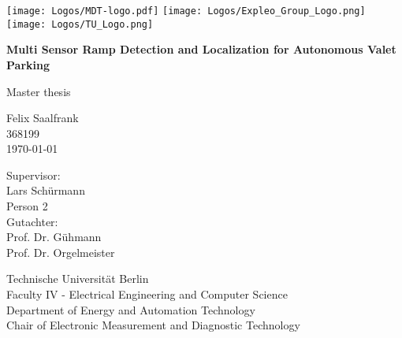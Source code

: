 \begin{titlepage}
	\begin{center} %
		\texttt{[image: Logos/MDT-logo.pdf]}
		\texttt{[image: Logos/Expleo\_Group\_Logo.png]}
		\texttt{[image: Logos/TU\_Logo.png]}
		\vspace*{1cm} %

		\Huge
		\textbf{Multi Sensor Ramp Detection and Localization for Autonomous Valet Parking}

		\vspace{0.5cm}
		Master thesis

		\vspace{1.5cm}
		\LARGE{Felix Saalfrank}\\
		\large 368199\\
		\vspace{1cm}
		\today

		\vspace{1.5cm}

		Supervisor:\\
		Lars Sch\"urmann\\
		Person 2\\
		Gutachter:\\
		Prof. Dr. G\"uhmann\\
		Prof. Dr. Orgelmeister

		\vfill

		\vspace{0.8cm}

		Technische Universit\"at Berlin\\
		Faculty IV - Electrical Engineering and Computer Science\\
		Department of Energy and Automation Technology\\
		Chair of Electronic Measurement and Diagnostic Technology\\
	\end{center}
\end{titlepage}